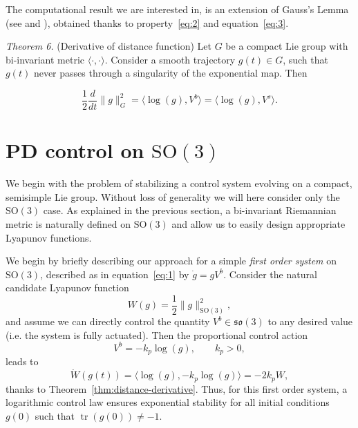 \documentclass[10pt,twocolumn]{article}
\newcommand{\SO}{\mathrm{SO}}
\newcommand{\so}{\mathfrak{so}}
\newcommand{\tr}{\operatorname{tr}}
\newcounter{paperitem}
\newcommand{\paperhead}[3]{\refstepcounter{paperitem}\par\medskip\noindent\textit{#1}\label{#3} #2\par}
\begin{document}
The computational result we are interested in, is an extension of Gauss's Lemma (see \cite{9} and \cite{10}), obtained thanks to property~\eqref{eq:2} and equation~\eqref{eq:3}.

\paperhead{Theorem 6.}{(Derivative of distance function) Let $G$ be a compact Lie group with bi-invariant metric $\langle\cdot,\cdot\rangle$. Consider a smooth trajectory $g(t)\in G$, such that $g(t)$ never passes through a singularity of the exponential map. Then}{thm:distance-derivative}
\begin{equation*}
\frac12\frac{d}{dt}\|g\|_G^2=\langle\log(g),V^b\rangle=\langle\log(g),V^s\rangle.
\end{equation*}

\section{PD control on $\SO(3)$}\label{sec:pd-so3}
We begin with the problem of stabilizing a control system evolving on a compact, semisimple Lie group. Without loss of generality we will here consider only the $\SO(3)$ case. As explained in the previous section, a bi-invariant Riemannian metric is naturally defined on $\SO(3)$ and allow us to easily design appropriate Lyapunov functions.


We begin by briefly describing our approach for a simple \emph{first order system} on $\SO(3)$, described as in equation~\eqref{eq:1} by $\dot g=gV^b$. Consider the natural candidate Lyapunov function
\begin{equation*}
W(g)=\frac12\|g\|_{\SO(3)}^2,
\end{equation*}
and assume we can directly control the quantity $V^b\in\so(3)$ to any desired value (i.e. the system is fully actuated). Then the proportional control action
\begin{equation*}
V^b=-k_p\log(g),\qquad k_p>0,\tag{4}\label{eq:4}
\end{equation*}
leads to
\begin{equation*}
\dot W(g(t))=\langle\log(g),-k_p\log(g)\rangle=-2k_pW,
\end{equation*}
thanks to Theorem~\ref{thm:distance-derivative}. Thus, for this first order system, a logarithmic control law ensures exponential stability for all initial conditions $g(0)$ such that $\tr(g(0))\neq-1$.
\end{document}
